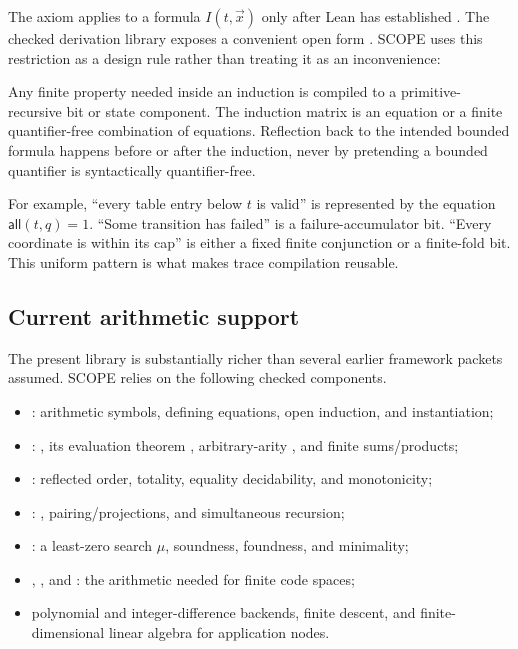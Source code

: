 The axiom  applies to a formula \(I(t,\vec x)\) only after Lean has established .  The checked derivation library exposes a convenient open form .  SCOPE uses this restriction as a design rule rather than treating it as an inconvenience:

\begin{principle}
Any finite property needed inside an induction is compiled to a primitive-recursive bit or state component.  The induction matrix is an equation or a finite quantifier-free combination of equations.  Reflection back to the intended bounded formula happens before or after the induction, never by pretending a bounded quantifier is syntactically quantifier-free.
\end{principle}

For example, ``every table entry below \(t\) is valid'' is represented by the equation \(\mathsf{all}(t,q)=1\).  ``Some transition has failed'' is a failure-accumulator bit.  ``Every coordinate is within its cap'' is either a fixed finite conjunction or a finite-fold bit.  This uniform pattern is what makes trace compilation reusable.

\subsection{Current arithmetic support}

The present  library is substantially richer than several earlier framework packets assumed.  SCOPE relies on the following checked components.

\begin{itemize}
\item {}: arithmetic symbols, defining equations, open induction, and instantiation;
\item {}: , its evaluation theorem , arbitrary-arity , and finite sums/products;
\item {}: reflected order, totality, equality decidability, and monotonicity;
\item {}: , pairing/projections, and simultaneous recursion;
\item {}: a least-zero search \(\mu\), soundness, foundness, and minimality;
\item {}, , and : the arithmetic needed for finite code spaces;
\item polynomial and integer-difference backends, finite descent, and finite-dimensional linear algebra for application nodes.
\end{itemize}

